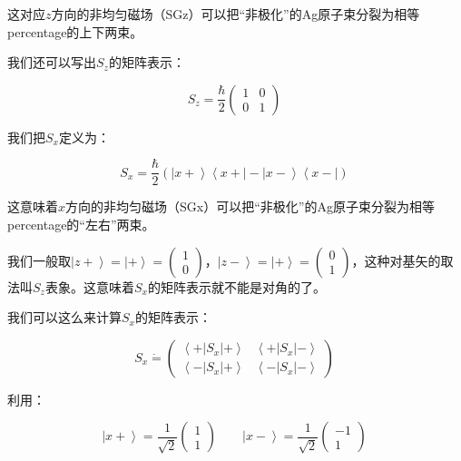 这对应$z$方向的非均匀磁场（SGz）可以把“非极化”的Ag原子束分裂为相等percentage的上下两束。

我们还可以写出$S_z$的矩阵表示：

\begin{equation}
S_z =  \frac{\hbar}{2} \left( \begin{array}{ccc}  1 & 0 \\ 0 & 1   \end{array}  \right)~
\end{equation}

我们把$S_x$定义为：

\begin{equation}
S_x = \frac{\hbar}{2} \left( \left| x+ \right\rangle \left\langle x+ \right| - \left| x- \right\rangle \left\langle x- \right| \right)~
\end{equation}

这意味着$x$方向的非均匀磁场（SGx）可以把“非极化”的Ag原子束分裂为相等percentage的“左右”两束。

我们一般取$\left| z+ \right\rangle = \left| + \right\rangle = \left( \begin{array}{ccc} 1 \\ 0 \end{array} \right)  $，$\left| z- \right\rangle = \left| + \right\rangle = \left( \begin{array}{ccc} 0 \\ 1 \end{array} \right)$，这种对基矢的取法叫$S_z$表象。这意味着$S_x$的矩阵表示就不能是对角的了。

我们可以这么来计算$S_x$的矩阵表示：

\begin{equation}
S_x \dot = \left( \begin{array}{ccc}  \left\langle + \right| S_x \left| + \right\rangle  &  \left\langle + \right| S_x \left| - \right\rangle \\   \left\langle - \right| S_x \left| + \right\rangle  &   \left\langle - \right| S_x \left| - \right\rangle  \end{array} \right) ~
\end{equation}

利用：

\begin{equation}
\left| x+ \right\rangle = \frac{1}{\sqrt{2}} \left(  \begin{array}{ccc} 1 \\ 1  \end{array} \right) \qquad
\left| x- \right\rangle = \frac{1}{\sqrt{2}} \left(  \begin{array}{ccc} -1 \\ 1  \end{array} \right)~
\end{equation}

